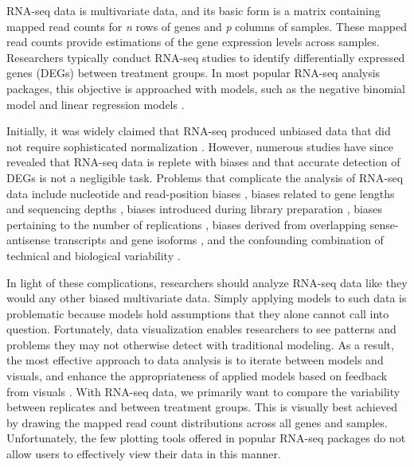 \documentclass[11pt,a4paper,oldfontcommands,openany]{memoir}
\numberwithin{equation}{section} %
\begin{document}
RNA-seq data is multivariate data, and its basic form is a matrix containing mapped read counts for \textit{n} rows of genes and \textit{p} columns of samples. These mapped read counts provide estimations of the gene expression levels across samples. Researchers typically conduct RNA-seq studies to identify differentially expressed genes (DEGs) between treatment groups. In most popular RNA-seq analysis packages, this objective is approached with models, such as the negative binomial model \citep{Anders2010, Trapnell2012, Trapnell2013, Robinson} and linear regression models \citep{Law}.

Initially, it was widely claimed that RNA-seq produced unbiased data that did not require sophisticated normalization \citep{Wang, Morin, Marioni}. However, numerous studies have since revealed that RNA-seq data is replete with biases and that accurate detection of DEGs is not a negligible task. Problems that complicate the analysis of RNA-seq data include nucleotide and read-position biases \citep{Hansen}, biases related to gene lengths and sequencing depths \citep{Oshlack, RobinsonOshlack}, biases introduced during library preparation \citep{McIntyre}, biases pertaining to the number of replications \citep{Schurch}, biases derived from overlapping sense-antisense transcripts and gene isoforms \citep{Trapnell2013}, and the confounding combination of technical and biological variability \citep{Bullard}.

In light of these complications, researchers should analyze RNA-seq data like they would any other biased multivariate data. Simply applying models to such data is problematic because models hold assumptions that they alone cannot call into question. Fortunately, data visualization enables researchers to see patterns and problems they may not otherwise detect with traditional modeling. As a result, the most effective approach to data analysis is to iterate between models and visuals, and enhance the appropriateness of applied models based on feedback from visuals \citep{Shneiderman}. With RNA-seq data, we primarily want to compare the variability between replicates and between treatment groups. This is visually best achieved by drawing the mapped read count distributions across all genes and samples. Unfortunately, the few plotting tools offered in popular RNA-seq packages do not allow users to effectively view their data in this manner.
\end{document}
